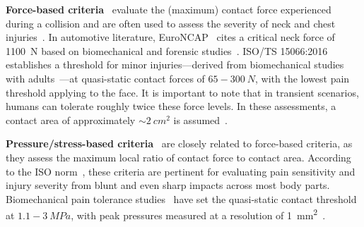 \textbf{Force-based criteria}~\citep{kirschner2021experimental} evaluate the (maximum) contact force experienced during a collision and are often used to assess the severity of neck and chest injuries~\citep{haddadin2013towards}. In automotive literature, EuroNCAP~\citep{EuroNCAP2004} cites a critical neck force of \SI{1100}{N} based on biomechanical and forensic studies~\citep{madea2019handbuch, haddadin2009requirements}. ISO/TS 15066:2016~\citep{iso2016collaborative} establishes a threshold for minor injuries—derived from biomechanical studies with adults~\citep{muttray2014kollaborierende}—at quasi-static contact forces of $65-300~\si{N}$, with the lowest pain threshold applying to the face. It is important to note that in transient scenarios, humans can tolerate roughly twice these force levels. In these assessments, a contact area of approximately $\sim 2~\si{cm^2}$ is assumed~\citep{iso2016collaborative}.

\textbf{Pressure/stress-based criteria}~\citep{wassink2007towards, haddadin2013towards} are closely related to force-based criteria, as they assess the maximum local ratio of contact force to contact area. According to the ISO norm~\citep{iso2016collaborative}, these criteria are pertinent for evaluating pain sensitivity and injury severity from blunt and even sharp impacts across most body parts. Biomechanical pain tolerance studies~\citep{muttray2014kollaborierende} have set the quasi-static contact threshold at $1.1-3~\si{MPa}$, with peak pressures measured at a resolution of \SI{1}{mm^2}~\citep{iso2016collaborative}.

